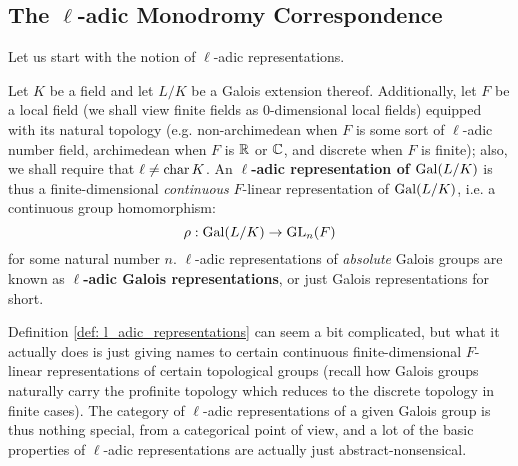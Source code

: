         \subsection{The \texorpdfstring{$\ell$}{}-adic Monodromy Correspondence}
            Let us start with the notion of $\ell$-adic representations. 
            \begin{definition} \label{def: l_adic_representations}
                Let $K$ be a field and let $L/K$ be a Galois extension thereof. Additionally, let $F$ be a local field (we shall view finite fields as $0$-dimensional local fields) equipped with its natural topology (e.g. non-archimedean when $F$ is some sort of $\ell$-adic number field, archimedean when $F$ is $\mathbb{R}$ or $\mathbb{C}$, and discrete when $F$ is finite); also, we shall require that $\ell \not = \operatorname{char} K$. An \textbf{$\ell$-adic representation of $\mathrm{Gal}(L/K)$} is thus a finite-dimensional \textit{continuous} $F$-linear representation of $\mathrm{Gal}(L/K)$, i.e. a continuous group homomorphism:
                    $$\rho: \mathrm{Gal}(L/K) \to \operatorname{GL}_n(F)$$
                for some natural number $n$. $\ell$-adic representations of \textit{absolute} Galois groups are known as \textbf{$\ell$-adic Galois representations}, or just Galois representations for short.
            \end{definition}
            \begin{remark}
                Definition \ref{def: l_adic_representations} can seem a bit complicated, but what it actually does is just giving names to certain continuous finite-dimensional $F$-linear representations of certain topological groups (recall how Galois groups naturally carry the profinite topology which reduces to the discrete topology in finite cases). The category of $\ell$-adic representations of a given Galois group is thus nothing special, from a categorical point of view, and a lot of the basic properties of $\ell$-adic representations are actually just abstract-nonsensical. 
            \end{remark}
